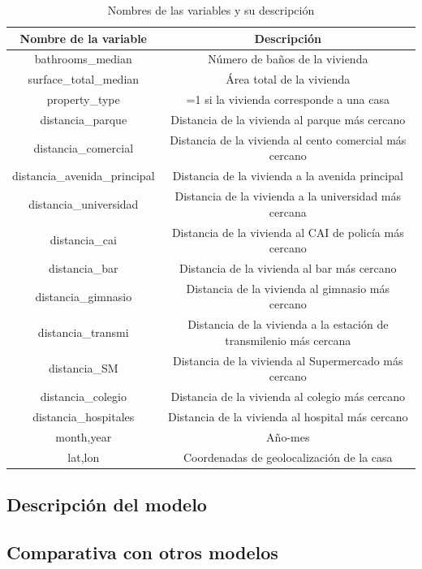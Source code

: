 \documentclass[
  11pt,
  letterpaper,
]{article}
\begin{document}
\begin{table}[ht]
\centering
\caption{Nombres de las variables y su descripción}
\begin{tabular}{|c|c|}
\hline
Nombre de la variable & Descripción  \\
\hline
\hline
bathrooms\_median & Número de baños de la vivienda \\
\hline
surface\_total\_median & Área total de la vivienda  \\
\hline
property\_type & =1 si la vivienda corresponde a una casa \\
\hline
distancia\_parque & Distancia de la vivienda al parque más cercano \\
\hline
distancia\_comercial & Distancia de la vivienda al cento comercial más cercano \\
\hline
distancia\_avenida\_principal & Distancia de la vivienda a la avenida principal\\
\hline
distancia\_universidad & Distancia de la vivienda a la universidad más cercana \\
\hline
distancia\_cai & Distancia de la vivienda al CAI de policía más cercano \\
\hline
distancia\_bar & Distancia de la vivienda al bar más cercano \\
\hline
distancia\_gimnasio & Distancia de la vivienda al gimnasio más cercano \\
\hline
distancia\_transmi & Distancia de la vivienda a la estación de transmilenio más cercana \\
\hline
distancia\_SM & Distancia de la vivienda al Supermercado más cercano \\
\hline
distancia\_colegio & Distancia de la vivienda al colegio más cercano \\
\hline
distancia\_hospitales & Distancia de la vivienda al hospital más cercano \\
\hline
month,year & Año-mes  \\
\hline
lat,lon & Coordenadas de geolocalización de la casa \\
\hline
\end{tabular}
\end{table}

\hypertarget{descripciuxf3n-del-modelo}{%
\subsection{Descripción del modelo}\label{descripciuxf3n-del-modelo}}

\hypertarget{comparativa-con-otros-modelos}{%
\subsection{Comparativa con otros modelos}\label{comparativa-con-otros-modelos}}
\end{document}
